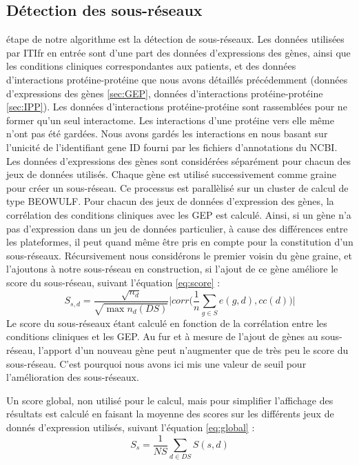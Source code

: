 		\subsection{\textcolor{mygreen}{Détection des sous-réseaux}}
			 étape de notre algorithme est la détection de sous-réseaux.
			Les données utilisées par \acs{ITIfr} en entrée sont d'une part des données d'expressions des gènes, ainsi que les conditions cliniques correspondantes aux patients, et des données d'interactions protéine-protéine que nous avons détaillés précédemment (données d'expressions des gènes \ref{sec:GEP}, données d'interactions protéine-protéine \ref{sec:IPP}).
			Les données d'interactions protéine-protéine sont rassemblées pour ne former qu'un seul interactome.
			Les interactions d'une protéine vers elle même n'ont pas été gardées.
			Nous avons gardés les interactions en nous basant sur l'unicité de l'identifiant gene ID fourni par les fichiers d'annotations du NCBI. 
			Les données d'expressions des gènes sont considérées séparément pour chacun des jeux de données utilisés.
			Chaque gène est utilisé successivement comme graine pour créer un sous-réseau.
			Ce processus est parallèlisé sur un cluster de calcul de type BEOWULF.
			Pour chacun des jeux de données d'expression des gènes, la corrélation des conditions cliniques avec les \acs{GEP} est calculé.
			Ainsi, si un gène n'a pas d'expression dans un jeu de données particulier, à cause des différences entre les plateformes, il peut quand même être pris en compte pour la constitution d'un sous-réseaux.
			Récursivement nous considérons le premier voisin du gène graine, et l'ajoutons à notre sous-réseau en construction, si l'ajout de ce gène améliore le score du sous-réseau, suivant l'équation \ref{eq:score} :
			\begin{equation}\label{eq:score}
				S_{s,d}=\frac{\sqrt{n_{d}}}{\sqrt{\max n_{d}(DS)}}\Bigg|corr\Bigg(\frac{1}{n}\sum_{g\in S}e(g,d),cc(d)\Bigg)\Bigg|
			\end{equation}
			Le score du sous-réseaux étant calculé en fonction de la corrélation entre les conditions cliniques et les \acs{GEP}.
			Au fur et à mesure de l'ajout de gènes au sous-réseau, l'apport d'un nouveau gène peut n'augmenter que de très peu le score du sous-réseau.
			C'est pourquoi nous avons ici mis une valeur de seuil pour l'amélioration des sous-réseaux.

			Un score global, non utilisé pour le calcul, mais pour simplifier l'affichage des résultats est calculé en faisant la moyenne des scores sur les différents jeux de donnés d'expression utilisés, suivant l'équation \ref{eq:global} :
			\begin{equation}\label{eq:global}
				S_{s}=\frac{1}{NS}\sum_{d\in DS}S(s,d)
			\end{equation}


